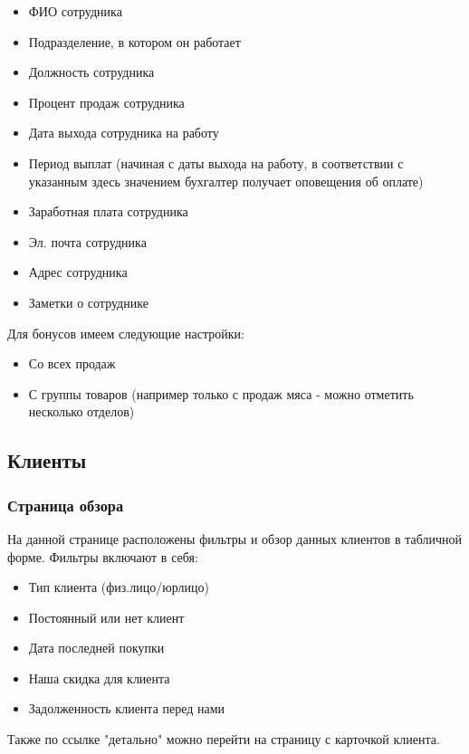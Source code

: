 \documentclass[DIV=calc, paper=a4, fontsize=11pt]{scrartcl} %
\begin{document}
\begin{itemize}
	\item ФИО сотрудника
	\item Подразделение, в котором он работает 
	\item Должность сотрудника
	\item Процент продаж сотрудника
	\item Дата выхода сотрудника на работу
	\item Период выплат (начиная с даты выхода на работу, в соответствии с указанным здесь значением бухгалтер получает оповещения об оплате)
	\item Заработная плата сотрудника
	\item Эл. почта сотрудника
	\item Адрес сотрудника
	\item Заметки о сотруднике
\end{itemize}

Для бонусов имеем следующие настройки:

\begin{itemize}
	\item Со всех продаж
	\item С группы товаров (например только с продаж мяса - можно отметить несколько отделов)
\end{itemize}

\subsection{Клиенты}

\subsubsection{Страница обзора}

На данной странице расположены фильтры и обзор данных клиентов в табличной форме. Фильтры включают в себя:

\begin{itemize}
	\item Тип клиента (физ.лицо/юрлицо)
	\item Постоянный или нет клиент
	\item Дата последней покупки
	\item Наша скидка для клиента
	\item Задолженность клиента перед нами
\end{itemize}

Также по ссылке "детально" можно перейти на страницу с карточкой клиента.
\end{document}
